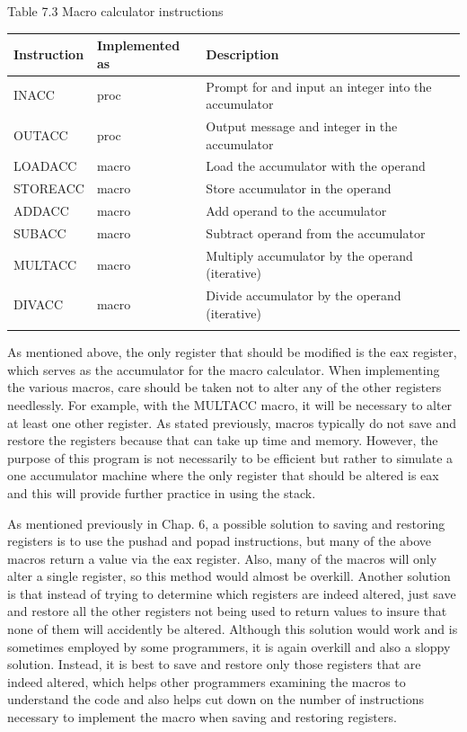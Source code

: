 \documentclass[10pt]{article}
\begin{document}
Table 7.3 Macro calculator instructions

\begin{center}
\begin{tabular}{lll|}
\hline
Instruction & Implemented as & Description \\
\hline
INACC & proc & Prompt for and input an integer into the accumulator \\
OUTACC & proc & Output message and integer in the accumulator \\
LOADACC & macro & Load the accumulator with the operand \\
STOREACC & macro & Store accumulator in the operand \\
ADDACC & macro & Add operand to the accumulator \\
SUBACC & macro & Subtract operand from the accumulator \\
MULTACC & macro & Multiply accumulator by the operand (iterative) \\
DIVACC & macro & Divide accumulator by the operand (iterative) \\
 &  &  \\
\end{tabular}
\end{center}

As mentioned above, the only register that should be modified is the eax register, which serves as the accumulator for the macro calculator. When implementing the various macros, care should be taken not to alter any of the other registers needlessly. For example, with the MULTACC macro, it will be necessary to alter at least one other register. As stated previously, macros typically do not save and restore the registers because that can take up time and memory. However, the purpose of this program is not necessarily to be efficient but rather to simulate a one accumulator machine where the only register that should be altered is eax and this will provide further practice in using the stack.

As mentioned previously in Chap. 6, a possible solution to saving and restoring registers is to use the pushad and popad instructions, but many of the above macros return a value via the eax register. Also, many of the macros will only alter a single register, so this method would almost be overkill. Another solution is that instead of trying to determine which registers are indeed altered, just save and restore all the other registers not being used to return values to insure that none of them will accidently be altered. Although this solution would work and is sometimes employed by some programmers, it is again overkill and also a sloppy solution. Instead, it is best to save and restore only those registers that are indeed altered, which helps other programmers examining the macros to understand the code and also helps cut down on the number of instructions necessary to implement the macro when saving and restoring registers.
\end{document}
